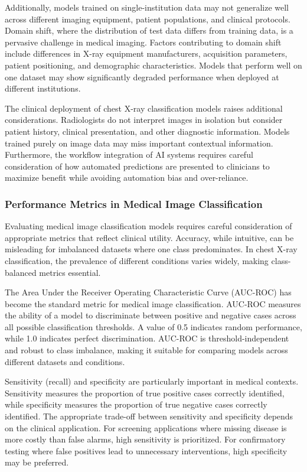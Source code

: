 \documentclass[12pt,a4paper]{article}
\begin{document}
Additionally, models trained on single-institution data may not generalize well across different imaging equipment, patient populations, and clinical protocols. Domain shift, where the distribution of test data differs from training data, is a pervasive challenge in medical imaging. Factors contributing to domain shift include differences in X-ray equipment manufacturers, acquisition parameters, patient positioning, and demographic characteristics. Models that perform well on one dataset may show significantly degraded performance when deployed at different institutions.

The clinical deployment of chest X-ray classification models raises additional considerations. Radiologists do not interpret images in isolation but consider patient history, clinical presentation, and other diagnostic information. Models trained purely on image data may miss important contextual information. Furthermore, the workflow integration of AI systems requires careful consideration of how automated predictions are presented to clinicians to maximize benefit while avoiding automation bias and over-reliance.

\subsubsection{Performance Metrics in Medical Image Classification}

Evaluating medical image classification models requires careful consideration of appropriate metrics that reflect clinical utility. Accuracy, while intuitive, can be misleading for imbalanced datasets where one class predominates. In chest X-ray classification, the prevalence of different conditions varies widely, making class-balanced metrics essential.

The Area Under the Receiver Operating Characteristic Curve (AUC-ROC) has become the standard metric for medical image classification. AUC-ROC measures the ability of a model to discriminate between positive and negative cases across all possible classification thresholds. A value of 0.5 indicates random performance, while 1.0 indicates perfect discrimination. AUC-ROC is threshold-independent and robust to class imbalance, making it suitable for comparing models across different datasets and conditions.

Sensitivity (recall) and specificity are particularly important in medical contexts. Sensitivity measures the proportion of true positive cases correctly identified, while specificity measures the proportion of true negative cases correctly identified. The appropriate trade-off between sensitivity and specificity depends on the clinical application. For screening applications where missing disease is more costly than false alarms, high sensitivity is prioritized. For confirmatory testing where false positives lead to unnecessary interventions, high specificity may be preferred.
\end{document}
